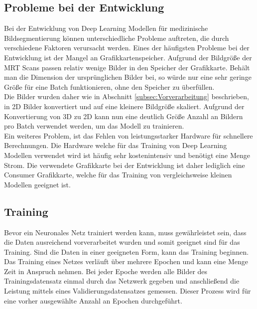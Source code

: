 \subsection{Probleme bei der Entwicklung}
Bei der Entwicklung von Deep Learning \gls{Modell}en für medizinische Bildsegmentierung können unterschiedliche Probleme auftreten, die durch verschiedene Faktoren verursacht werden. Eines der häufigsten Probleme bei der Entwicklung ist der Mangel an Grafikkartenspeicher. Aufgrund der  Bildgröße der \ac{MRT} Scans passen relativ wenige Bilder in den Speicher der Grafikkarte. Behält man die Dimension der ursprünglichen Bilder bei, so würde nur eine sehr geringe Größe für eine Batch funktionieren, ohne den Speicher zu überfüllen. \\
Die Bilder wurden daher wie in Abschnitt \ref{subsec:Vorverarbeitung} beschrieben, in 2D Bilder konvertiert und auf eine kleinere Bildgröße skaliert. Aufgrund der Konvertierung von 3D zu 2D kann nun eine deutlich Größe Anzahl an Bildern pro Batch verwendet werden, um das \gls{Modell} zu trainieren.\\
Ein weiteres Problem, ist das Fehlen von leistungsstarker Hardware für schnellere Berechnungen. Die Hardware welche für das Training von Deep Learning \gls{Modell}en verwendet wird ist häufig sehr kostenintensiv und benötigt eine Menge Strom. Die verwendete Grafikkarte bei der Entwicklung ist daher lediglich eine Consumer Grafikkarte, welche für das Training von vergleichsweise kleinen \gls{Modell}en geeignet ist.

\subsection{Training}
Bevor ein Neuronales Netz trainiert werden kann, muss gewährleistet sein, dass die Daten ausreichend vorverarbeitet wurden und somit geeignet sind für das Training. Sind die Daten in einer geeigneten Form, kann das Training beginnen. Das Training eines Netzes verläuft über mehrere Epochen und kann eine Menge Zeit in Anspruch nehmen. Bei jeder Epoche werden alle Bilder des Trainingsdatensatz einmal durch das Netzwerk gegeben und anschließend die Leistung mittels eines Validierungsdatensatzes gemessen. Dieser Prozess wird für eine vorher ausgewählte Anzahl an Epochen durchgeführt.

